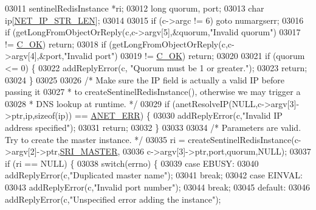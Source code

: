 \begin{DoxyCode}
{{{{{{{{{{{{{{{{{{{{{{{{{{{{{{{{{{{{{{{{{{{{{{{{{{{{{{{{{{03011         sentinelRedisInstance *ri;
03012         \textcolor{keywordtype}{long} quorum, port;
03013         \textcolor{keywordtype}{char} ip[\hyperlink{server_8h_ad97c5405ed22a94e9fcc10fba577d6c0}{NET\_IP\_STR\_LEN}];
03014 
03015         \textcolor{keywordflow}{if} (c->argc != 6) \textcolor{keywordflow}{goto} numargserr;
03016         \textcolor{keywordflow}{if} (getLongFromObjectOrReply(c,c->argv[5],&quorum,\textcolor{stringliteral}{"Invalid quorum"})
03017             != \hyperlink{server_8h_a303769ef1065076e68731584e758d3e1}{C\_OK}) \textcolor{keywordflow}{return};
03018         \textcolor{keywordflow}{if} (getLongFromObjectOrReply(c,c->argv[4],&port,\textcolor{stringliteral}{"Invalid port"})
03019             != \hyperlink{server_8h_a303769ef1065076e68731584e758d3e1}{C\_OK}) \textcolor{keywordflow}{return};
03020 
03021         \textcolor{keywordflow}{if} (quorum <= 0) \{
03022             addReplyError(c, \textcolor{stringliteral}{"Quorum must be 1 or greater."});
03023             \textcolor{keywordflow}{return};
03024         \}
03025 
03026         \textcolor{comment}{/* Make sure the IP field is actually a valid IP before passing it}
03027 \textcolor{comment}{         * to createSentinelRedisInstance(), otherwise we may trigger a}
03028 \textcolor{comment}{         * DNS lookup at runtime. */}
03029         \textcolor{keywordflow}{if} (anetResolveIP(NULL,c->argv[3]->ptr,ip,\textcolor{keyword}{sizeof}(ip)) == \hyperlink{anet_8h_a0697b7774a7e0f4ef141839fe93536fe}{ANET\_ERR}) \{
03030             addReplyError(c,\textcolor{stringliteral}{"Invalid IP address specified"});
03031             \textcolor{keywordflow}{return};
03032         \}
03033 
03034         \textcolor{comment}{/* Parameters are valid. Try to create the master instance. */}
03035         ri = createSentinelRedisInstance(c->argv[2]->ptr,\hyperlink{sentinel_8c_a2ee83e5ff67b45746cd6a310f15334b2}{SRI\_MASTER},
03036                 c->argv[3]->ptr,port,quorum,NULL);
03037         \textcolor{keywordflow}{if} (ri == NULL) \{
03038             \textcolor{keywordflow}{switch}(errno) \{
03039             \textcolor{keywordflow}{case} EBUSY:
03040                 addReplyError(c,\textcolor{stringliteral}{"Duplicated master name"});
03041                 \textcolor{keywordflow}{break};
03042             \textcolor{keywordflow}{case} EINVAL:
03043                 addReplyError(c,\textcolor{stringliteral}{"Invalid port number"});
03044                 \textcolor{keywordflow}{break};
03045             \textcolor{keywordflow}{default}:
03046                 addReplyError(c,\textcolor{stringliteral}{"Unspecified error adding the instance"});
}}}}}}}}}}}}}}}}}}}}}}}}}}}}}}}}}}}}}}}}}}}}}}}}}}}}}}}}}}
\end{DoxyCode}
